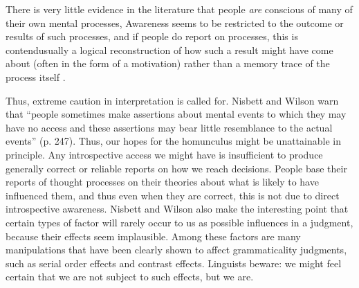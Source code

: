 There is very little evidence in the literature that people \textit{are} conscious of many of their own mental processes, Awareness seems to be restricted to the outcome or results of such processes, and if people do report on processes, this is\schdash{}\citet{NisbettEtAl1977} contend\schdash{}usually a logical reconstruction of how such a result might have come about (often in the form of a motivation) rather than a memory trace of the process itself  \citep[7]{LeveltEtAl1978}.

Thus, extreme caution in interpretation is called for. Nisbett and Wilson warn that ``people sometimes make assertions about mental events to which they may have no access and these assertions may bear little resemblance to the actual events'' (p. 247). Thus, our hopes for the homunculus might be unattainable in principle. Any introspective access we might have is insufficient to produce generally correct or reliable reports on how we reach decisions. People base their reports of thought processes on their theories about what is likely to have influenced them, and thus even when they are correct, this is not due to direct introspective awareness. Nisbett and Wilson also make the interesting point that certain types of factor will  rarely occur to us as possible influences in a judgment, because their effects seem implausible. Among these factors are many manipulations that have been clearly shown to affect grammaticality judgments, such as serial order effects and contrast effects. Linguists beware: we might feel certain that we are not subject to such effects, but we are.

